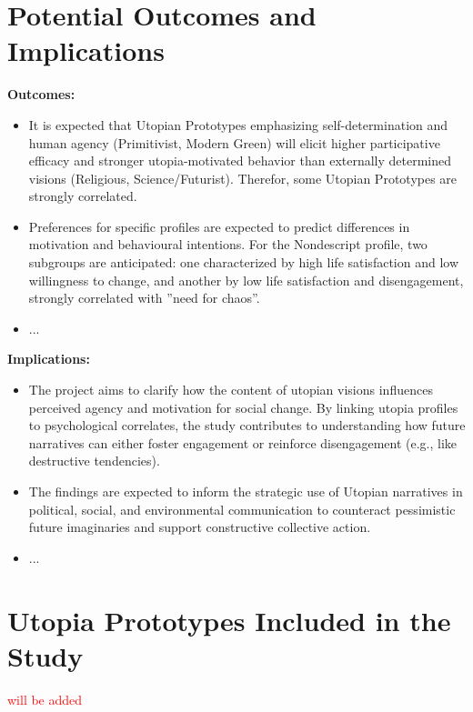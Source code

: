 \documentclass[jou,floatsintext]{apa7}
\begin{document}
\section{Potential Outcomes and Implications}


\textbf{Outcomes:}


\begin{itemize}
    \item It is expected that Utopian Prototypes emphasizing self-determination and human agency (Primitivist, Modern Green) will elicit higher participative efficacy and stronger utopia-motivated behavior than externally determined visions (Religious, Science/Futurist). Therefor, some Utopian Prototypes are strongly correlated.
    \item  Preferences for specific profiles are expected to predict differences in motivation and behavioural intentions. For the Nondescript profile, two subgroups are anticipated: one characterized by high life satisfaction and low willingness to change, and another by low life satisfaction and disengagement, strongly correlated with ''need for chaos''.
    \item ...
\end{itemize}


\textbf{Implications:}

\begin{itemize}
    \item The project aims to clarify how the content of utopian visions influences perceived agency and motivation for social change. By linking utopia profiles to psychological correlates, the study contributes to understanding how future narratives can either foster engagement or reinforce disengagement (e.g., like destructive tendencies).
    \item  The findings are expected to inform the strategic use of Utopian narratives in political, social, and environmental communication to counteract pessimistic future imaginaries and support constructive collective action.
    \item ...
\end{itemize}



\clearpage
\printbibliography


\clearpage
\appendix

\section{Utopia Prototypes Included in the Study}
\label{appendix:finalUtopiaProto}

\textcolor{red}{will be added}
\end{document}
